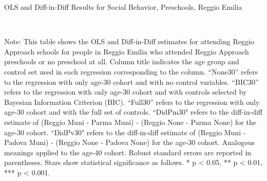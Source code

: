 \begin{landscape}
\begin{table}[H] \caption{OLS and Diff-in-Diff Results for Social Behavior, Preschools, Reggio Emilia} \label{ols-S-reg}
\scalebox{0.85}{
}
\vspace{1ex} \\
\footnotesize\raggedright{Note: This table shows the OLS and Diff-in-Diff estimates for attending Reggio Approach schools for people in Reggio Emilia who attended Reggio Approach preschools or no preschool at all. Column title indicates the age group and control set used in each regression corresponding to the column. ``None30'' refers to the regression with only age-30 cohort and with no control variables. ``BIC30'' refers to the regression with only age-30 cohort and with controls selected by Bayesian Information Criterion (BIC). ``Full30'' refers to the regression with only age-30 cohort and with the full set of controls. ``DidPm30" refers to the diff-in-diff estimate of (Reggio Muni - Parma Muni) - (Reggio None - Parma None) for the age-30 cohort. ``DidPv30" refers to the diff-in-diff estimate of (Reggio Muni - Padova Muni) - (Reggio None - Padova None) for the age-30 cohort. Analogous meanings applied to the age-40 cohort. Robust standard errors are reported in parentheses. Stars show statistical significance as follows. * p < 0.05, ** p < 0.01, *** p < 0.001.}
\end{table}

\end{landscape}
